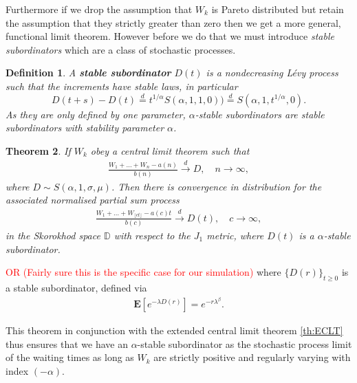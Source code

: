 \documentclass[honours,12pt]{UNSWthesis}
\newcommand{\ex}{\mathbf {E}}
\newcommand{\1}{\mathbf 1}
\newcommand{\Floor}[1]{{\lfloor {#1} \rfloor}}
\newcommand{\cd}{\overset{d}{\longrightarrow}}
\newcommand{\D}{\mathbb{D}}
\newtheorem{theorem}{Theorem}[section]
\newtheorem{definition}[theorem]{Definition}
\numberwithin{equation}{section}
\theoremstyle{definition}
\theoremstyle{remark}
\begin{document}
Furthermore if we drop the assumption that $W_k$ is Pareto distributed but retain the assumption that they strictly greater than zero then we get a more general, functional limit theorem. However before we do that we must introduce \emph{stable subordinators} which are a class of stochastic processes.
\begin{definition}
A \textbf{stable subordinator} $D(t)$ is a nondecreasing L\'{e}vy process such that the increments have stable laws, in particular
\[
	D(t+s)-D(t)\overset{d}{=}t^{1/\alpha}S(\alpha,1,1,0))\overset{d}{=}S(\alpha,1,t^{1/\alpha},0).
\]
As they are only defined by one parameter, $\alpha$-stable subordinators are stable subordinators with stability parameter $\alpha$.
\end{definition}
\begin{theorem}\cite[Th.~4.5.3]{Whitt2010}\label{th:sfclt} If $W_k$ obey a central limit theorem such that
\begin{align}\label{eq:sclt}
	\frac{W_1 + \ldots + W_n - a(n)}{b(n)} \overset{d}{\longrightarrow} D, \quad n \to \infty,
\end{align}
where $D\sim S(\alpha,1,\sigma,\mu)$. Then there is convergence in distribution for the associated normalised partial sum process
\begin{align}
\frac{W_1 + \ldots + W_\Floor{ct} - a(c)t}{b(c)} \cd D(t), \quad c \to \infty,
\end{align}
in the Skorokhod space $\D$ with respect to the $J_1$ metric, where $D(t)$ is a $\alpha$-stable subordinator.
\end{theorem}

\textcolor{red}{OR (Fairly sure this is the specific case for our simulation)}
where $\{D(r)\}_{t \ge 0}$ is a stable subordinator, defined via 
\begin{align}
\ex[e^{-\lambda D(r)}] = e^{-r \lambda^\beta}.
\end{align}

This theorem in conjunction with the extended central limit theorem \ref{th:ECLT} thus ensures that we have an $\alpha$-stable subordinator as the stochastic process limit of the waiting times as long as $W_k$ are strictly positive and regularly varying with index $(-\alpha)$.
\end{document}
